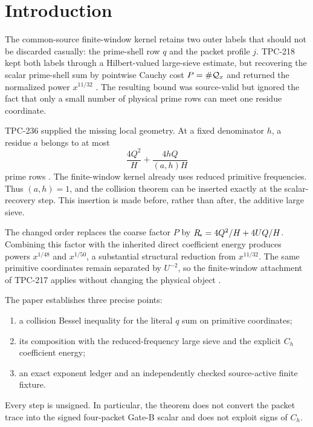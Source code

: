 \section{Introduction}

The common-source finite-window kernel retains two outer labels that should not be
discarded casually: the prime-shell row $q$ and the packet profile $j$.  TPC-218 kept
both labels through a Hilbert-valued large-sieve estimate, but recovering the scalar
prime-shell sum by pointwise Cauchy cost $P=\#\mathcal Q_x$ and returned the normalized power
$x^{11/32}$ \citep{WangTPC218}.  The resulting bound was source-valid but ignored the
fact that only a small number of physical prime rows can meet one residue coordinate.

TPC-236 supplied the missing local geometry.  At a fixed denominator $h$, a residue
$a$ belongs to at most
\[
 \frac{4Q^2}{H}+\frac{4hQ}{(a,h)H}
\]
prime rows \citep{WangTPC236}.  The finite-window kernel already uses reduced
primitive frequencies.  Thus $(a,h)=1$, and the collision theorem can be inserted
exactly at the scalar-recovery step.  This insertion is made before, rather than
after, the additive large sieve.

The changed order replaces the coarse factor $P$ by
$R_{\!*}=4Q^2/H+4UQ/H$.  Combining this factor with the inherited direct coefficient
energy produces powers $x^{1/48}$ and $x^{1/50}$, a substantial structural reduction
from $x^{11/32}$.  The same primitive coordinates remain separated by $U^{-2}$, so
the finite-window attachment of TPC-217 applies without changing the physical object
\citep{WangTPC217}.

The paper establishes three precise points:
\begin{enumerate}[leftmargin=2em]
  \item a collision Bessel inequality for the literal $q$ sum on primitive
        coordinates;
  \item its composition with the reduced-frequency large sieve and the explicit
        $C_h$ coefficient energy;
  \item an exact exponent ledger and an independently checked source-active finite
        fixture.
\end{enumerate}
Every step is unsigned.  In particular, the theorem does not convert the packet trace
into the signed four-packet Gate-B scalar and does not exploit signs of $C_h$.
